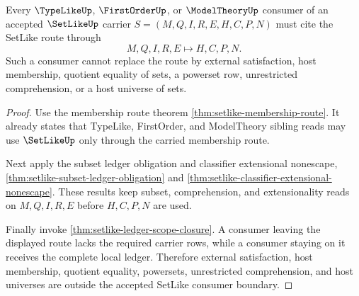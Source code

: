 \begin{theorem}
\label{thm:setlike-typelike-firstorder-modeltheory-consumer-boundary}
Every $\TypeLikeUp$, $\FirstOrderUp$, or $\ModelTheoryUp$ consumer of an accepted $\SetLikeUp$ carrier $S=(M,Q,I,R,E,H,C,P,N)$ must cite the SetLike route through
$$
M,Q,I,R,E \longmapsto H,C,P,N .
$$
Such a consumer cannot replace the route by external satisfaction, host membership, quotient equality of sets, a powerset row, unrestricted comprehension, or a host universe of sets.
\end{theorem}
\begin{proof}
Use the membership route theorem \autoref{thm:setlike-membership-route}. It already states that TypeLike, FirstOrder, and ModelTheory sibling reads may use $\SetLikeUp$ only through the carried membership route.

Next apply the subset ledger obligation and classifier extensional nonescape, \autoref{thm:setlike-subset-ledger-obligation} and \autoref{thm:setlike-classifier-extensional-nonescape}. These results keep subset, comprehension, and extensionality reads on $M,Q,I,R,E$ before $H,C,P,N$ are used.

Finally invoke \autoref{thm:setlike-ledger-scope-closure}. A consumer leaving the displayed route lacks the required carrier rows, while a consumer staying on it receives the complete local ledger. Therefore external satisfaction, host membership, quotient equality, powersets, unrestricted comprehension, and host universes are outside the accepted SetLike consumer boundary.
\end{proof}


